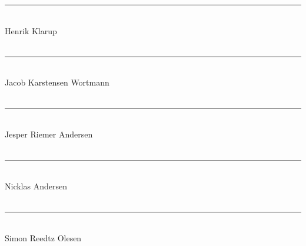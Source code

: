 \setcounter{page}{5}
\thispagestyle{empty}

\noindent\rule{8cm}{0.03cm}\\
Henrik Klarup\\\\

\noindent\rule{8cm}{0.03cm}\\
Jacob Karstensen Wortmann\\\\

\noindent\rule{8cm}{0.03cm}\\ 
Jesper Riemer Andersen\\ \\

\noindent\rule{8cm}{0.03cm}\\
Nicklas Andersen\\\\

\noindent\rule{8cm}{0.03cm}\\
Simon Reedtz Olesen\\\\
